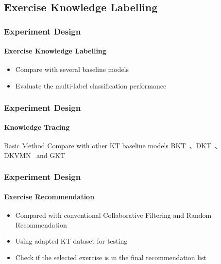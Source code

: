 \documentclass{beamer}
\begin{document}
\subsection{Exercise Knowledge Labelling}
\begin{frame}
  \frametitle{Experiment Design}
  \framesubtitle{Exercise Knowledge Labelling}
  \begin{itemize}
    \item Compare with several baseline models
    \item Evaluate the multi-label classification performance
  \end{itemize}
\end{frame}

\begin{frame}
  \frametitle{Experiment Design}
  \framesubtitle{Knowledge Tracing}
  \begin{block}{Basic Method}
    Compare with other KT baseline models BKT~\cite{yudelson2013individualized}、DKT~\cite{piech2015deep}、DKVMN~\cite{chen2017improving} and GKT~\cite{nakagawa2019graph}
  \end{block}
  \begin{table}[htbp!]
    \centering
    \caption{Dataset Statistics}\label{tbl:ch2-tb1}
  \end{table}
\end{frame}

\begin{frame}
  \frametitle{Experiment Design}
  \framesubtitle{Exercise Recommendation}
  \begin{itemize}
    \item Compared with conventional Collaborative Filtering and Random Recommendation
    \item Using adapted KT dataset for testing
    \item Check if the selected exercise is in the final recommendation list
  \end{itemize}
\end{frame}
\end{document}
